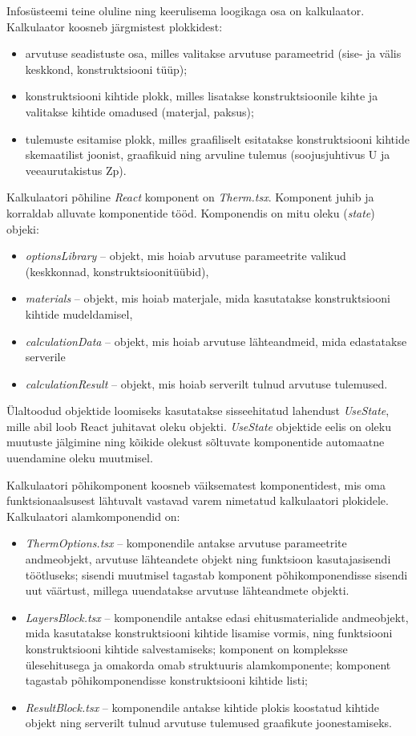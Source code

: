 Infosüsteemi teine oluline ning keerulisema loogikaga osa on kalkulaator. Kalkulaator koosneb järgmistest plokkidest:
\begin{itemize}
    \item arvutuse seadistuste osa, milles valitakse arvutuse parameetrid (sise- ja välis keskkond, konstruktsiooni tüüp);
    \item konstruktsiooni kihtide plokk, milles lisatakse konstruktsioonile kihte ja valitakse kihtide omadused (materjal, paksus);
    \item tulemuste esitamise plokk, milles graafiliselt esitatakse konstruktsiooni kihtide skemaatilist joonist, graafikuid ning arvuline tulemus 
    (soojusjuhtivus U ja veeaurutakistus Zp).
\end{itemize}

Kalkulaatori põhiline \textit{React} komponent on \textit{Therm.tsx}. Komponent juhib ja korraldab alluvate komponentide tööd. Komponendis on mitu oleku (\textit{state}) objeki:
\begin{itemize}
    \item \textit{optionsLibrary} -- objekt, mis hoiab arvutuse parameetrite valikud (keskkonnad, konstruktsioonitüübid),
    \item \textit{materials} -- objekt, mis hoiab materjale, mida kasutatakse konstruktsiooni kihtide mudeldamisel,
    \item \textit{calculationData} -- objekt, mis hoiab arvutuse lähteandmeid, mida edastatakse serverile
    \item \textit{calculationResult} -- objekt, mis hoiab serverilt tulnud arvutuse tulemused.
\end{itemize}

Ülaltoodud objektide loomiseks kasutatakse  sisseehitatud lahendust \textit{UseState}, mille abil loob React juhitavat oleku objekti. \textit{UseState}
objektide eelis on oleku muutuste jälgimine ning kõikide olekust sõltuvate komponentide automaatne uuendamine oleku muutmisel.

Kalkulaatori põhikomponent koosneb väiksematest komponentidest, mis oma funktsionaalsusest lähtuvalt vastavad varem nimetatud kalkulaatori plokidele.
Kalkulaatori alamkomponendid on:
\begin{itemize}
    \item \textit{ThermOptions.tsx} -- komponendile antakse arvutuse parameetrite andmeobjekt, arvutuse lähteandete objekt ning funktsioon kasutajasisendi töötluseks;
    sisendi muutmisel tagastab komponent põhikomponendisse sisendi uut väärtust, millega uuendatakse arvutuse lähteandmete objekti.
    \item \textit{LayersBlock.tsx} -- komponendile antakse edasi ehitusmaterialide andmeobjekt, mida kasutatakse konstruktsiooni kihtide lisamise vormis, ning funktsiooni
    konstruktsiooni kihtide salvestamiseks; komponent on kompleksse ülesehitusega ja omakorda omab struktuuris alamkomponente; komponent tagastab põhikomponendisse konstruktsiooni
    kihtide listi;
    \item \textit{ResultBlock.tsx} -- komponendile antakse kihtide plokis koostatud kihtide objekt ning serverilt tulnud arvutuse tulemused graafikute joonestamiseks. 
\end{itemize}

